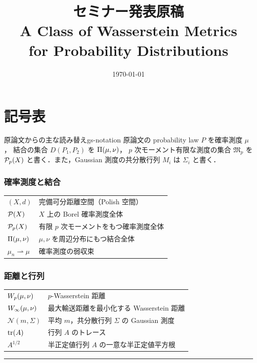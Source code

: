 \documentclass[uplatex, dvipdfmx]{jsreport}
\title{セミナー発表原稿\\{\Large A Class of Wasserstein Metrics\\for Probability Distributions}}
\author{}
\date{\today}
\begin{document}
\maketitle
\tableofcontents

\chapter*{記号表}

\begin{remark}{原論文からの主な読み替え}{gs-notation}
  原論文の probability law $P$ を確率測度 $\mu$，
  結合の集合 $D(P_1,P_2)$ を $\Pi(\mu,\nu)$，
  $p$ 次モーメント有限な測度の集合 $\mathfrak{M}_p$ を
  $\mathcal{P}_{p}(X)$ と書く．また，Gaussian 測度の共分散行列 $M_i$ は
  $\Sigma_i$ と書く．
\end{remark}

\subsection*{確率測度と結合}
\begin{tabular}{ll}
  $(X,d)$ & 完備可分距離空間（Polish 空間）\\
  $\mathcal{P}(X)$ & $X$ 上の Borel 確率測度全体 \\
  $\mathcal{P}_{p}(X)$ & 有限 $p$ 次モーメントをもつ確率測度全体 \\
  $\Pi(\mu,\nu)$ & $\mu,\nu$ を周辺分布にもつ結合全体 \\
  $\mu_n \rightharpoonup \mu$ & 確率測度の弱収束 \\
\end{tabular}

\subsection*{距離と行列}
\begin{tabular}{ll}
  $W_p(\mu, \nu)$ & $p$-Wasserstein 距離 \\
  $W_\infty(\mu,\nu)$ & 最大輸送距離を最小化する Wasserstein 距離 \\
  $\mathcal{N}(m,\Sigma)$ & 平均 $m$，共分散行列 $\Sigma$ の Gaussian 測度 \\
  $\operatorname{tr}(A)$ & 行列 $A$ のトレース \\
  $A^{1/2}$ & 半正定値行列 $A$ の一意な半正定値平方根 \\
\end{tabular}

\vspace{1em}
\hrule




\end{document}
